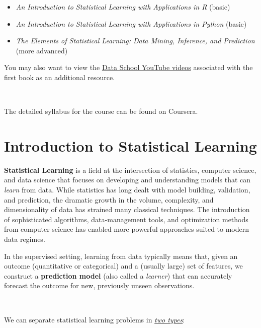 \documentclass[
]{book}
\providecommand{\tightlist}{%
  \setlength{\itemsep}{0pt}\setlength{\parskip}{0pt}}
\begin{document}
\begin{itemize}
\tightlist
\item
  \emph{An Introduction to Statistical Learning with Applications in R} (basic)
\item
  \emph{An Introduction to Statistical Learning with Applications in Python} (basic)
\item
  \emph{The Elements of Statistical Learning: Data Mining, Inference, and Prediction} (more advanced)
\end{itemize}

You may also want to view the \href{https://www.youtube.com/playlist?list=PL5-da3qGB5IDMEgF2WXqfCG5nfztd8r_n}{Data School YouTube videos} associated with the first book as an additional resource.

~

The detailed syllabus for the course can be found on Coursera.

\chapter{Introduction to Statistical Learning}\label{introduction-to-statistical-learning}

\textbf{Statistical Learning} is a field at the intersection of statistics, computer science, and data science that focuses on developing and understanding models that can \emph{learn} from data. While statistics has long dealt with model building, validation, and prediction, the dramatic growth in the volume, complexity, and dimensionality of data has strained many classical techniques. The introduction of sophisticated algorithms, data-management tools, and optimization methods from computer science has enabled more powerful approaches suited to modern data regimes.

In the supervised setting, learning from data typically means that, given an outcome (quantitative or categorical) and a (usually large) set of features, we construct a \textbf{prediction model} (also called a \emph{learner}) that can accurately forecast the outcome for new, previously unseen observations.

~

We can separate statistical learning problems in \ul{\emph{two types}}:
\end{document}
